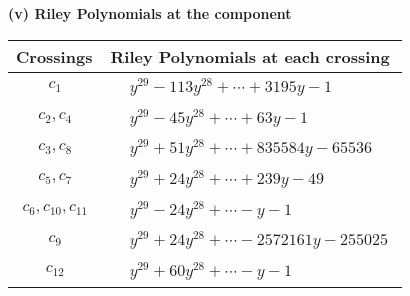 \documentclass[1p]{elsarticle_modified}
\theoremstyle{definition}
\begin{document}
\newpage\renewcommand{\arraystretch}{1}
\flushleft \textbf{(v) Riley Polynomials at the component}\newline \\
\begin{tabular}{m{50pt}|m{274pt}}
Crossings & \hspace{64pt}Riley Polynomials at each crossing \\
\hline $$\begin{aligned}c_{1}\end{aligned}$$&$\begin{aligned}
&y^{29}-113 y^{28}+\cdots+3195 y-1
\end{aligned}$\\
\hline $$\begin{aligned}c_{2},c_{4}\end{aligned}$$&$\begin{aligned}
&y^{29}-45 y^{28}+\cdots+63 y-1
\end{aligned}$\\
\hline $$\begin{aligned}c_{3},c_{8}\end{aligned}$$&$\begin{aligned}
&y^{29}+51 y^{28}+\cdots+835584 y-65536
\end{aligned}$\\
\hline $$\begin{aligned}c_{5},c_{7}\end{aligned}$$&$\begin{aligned}
&y^{29}+24 y^{28}+\cdots+239 y-49
\end{aligned}$\\
\hline $$\begin{aligned}c_{6},c_{10},c_{11}\end{aligned}$$&$\begin{aligned}
&y^{29}-24 y^{28}+\cdots- y-1
\end{aligned}$\\
\hline $$\begin{aligned}c_{9}\end{aligned}$$&$\begin{aligned}
&y^{29}+24 y^{28}+\cdots-2572161 y-255025
\end{aligned}$\\
\hline $$\begin{aligned}c_{12}\end{aligned}$$&$\begin{aligned}
&y^{29}+60 y^{28}+\cdots- y-1
\end{aligned}$\\
\hline
\end{tabular}\\~\\
\end{document}
